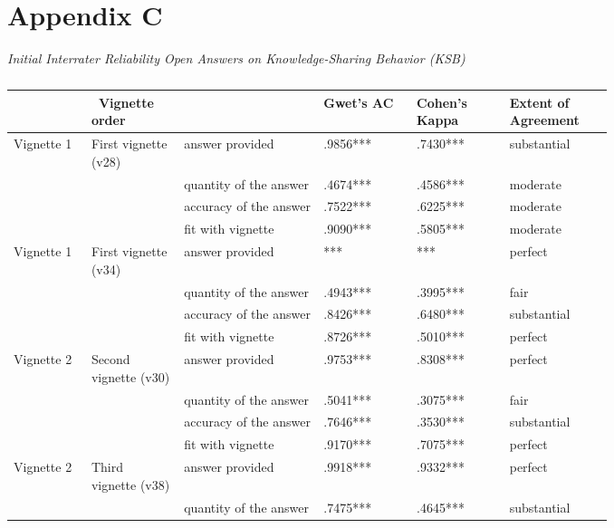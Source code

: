\documentclass[twocolumn, serif, empirical, authordate]{jote-article}
\begin{document}
\section*{Appendix C}
\label{app:appendixC}
\label{sec:Appendix C}

\emph{Initial Interrater Reliability Open Answers on Knowledge-Sharing Behavior (KSB)} 

\begin{table*}[h!]\sffamily
\caption{}
\label{tab:table5}

\begin{tabularx}{\linewidth}{
>{\raggedright\arraybackslash}p{0.1010\linewidth}
>{\raggedright\arraybackslash}p{0.1010\linewidth}
>{\raggedright\arraybackslash}p{0.1885\linewidth}
>{\raggedright\arraybackslash}p{0.1263\linewidth}
>{\raggedright\arraybackslash}p{0.1263\linewidth}
>{\raggedright\arraybackslash}p{0.1262\linewidth}
}
        &  Vignette order &   & Gwet's AC & Cohen's Kappa & Extent of Agreement \\ 
 \toprule 
 Vignette 1 & First vignette (v28) & answer provided & .9856*** & .7430*** & substantial \\ 
  &  & quantity of the answer & .4674*** & .4586*** & moderate \\ 
  &  & accuracy of the answer & .7522*** & .6225*** & moderate \\ 
  &  & fit with vignette & .9090*** & .5805*** & moderate \\ 
 Vignette 1 & First vignette (v34) & answer provided & 1.0000*** & 1.0000*** & perfect \\ 
  &  & quantity of the answer & .4943*** & .3995*** & fair \\ 
  &  & accuracy of the answer & .8426*** & .6480*** & substantial \\ 
  &  & fit with vignette & .8726*** & .5010*** & perfect \\ 
 Vignette 2 & Second vignette (v30) & answer provided & .9753*** & .8308*** & perfect \\ 
  &  & quantity of the answer & .5041*** & .3075*** & fair \\ 
  &  & accuracy of the answer & .7646*** & .3530*** & substantial \\ 
  &  & fit with vignette & .9170*** & .7075*** & perfect \\ 
 Vignette 2 & Third vignette (v38) & answer provided & .9918*** & .9332*** & perfect \\ 
  &  & quantity of the answer & .7475*** & .4645*** & substantial \\ 

\end{tabularx}
\end{table*}
\end{document}
